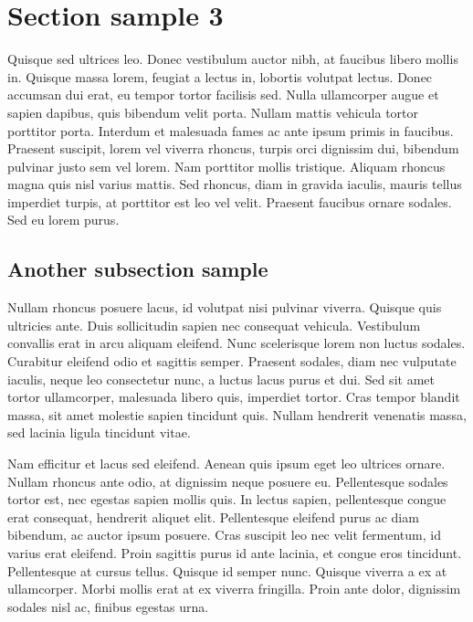 %

\section{Section sample 3}

Quisque sed ultrices leo. Donec vestibulum auctor nibh, at faucibus libero mollis in. Quisque massa lorem, feugiat a lectus in, lobortis volutpat lectus. Donec accumsan dui erat, eu tempor tortor facilisis sed. Nulla ullamcorper augue et sapien dapibus, quis bibendum velit porta. Nullam mattis vehicula tortor porttitor porta. Interdum et malesuada fames ac ante ipsum primis in faucibus. Praesent suscipit, lorem vel viverra rhoncus, turpis orci dignissim dui, bibendum pulvinar justo sem vel lorem. Nam porttitor mollis tristique. Aliquam rhoncus magna quis nisl varius mattis. Sed rhoncus, diam in gravida iaculis, mauris tellus imperdiet turpis, at porttitor est leo vel velit. Praesent faucibus ornare sodales. Sed eu lorem purus.  

\subsection{Another subsection sample}

Nullam rhoncus posuere lacus, id volutpat nisi pulvinar viverra. Quisque quis ultricies ante. Duis sollicitudin sapien nec consequat vehicula. Vestibulum convallis erat in arcu aliquam eleifend. Nunc scelerisque lorem non luctus sodales. Curabitur eleifend odio et sagittis semper. Praesent sodales, diam nec vulputate iaculis, neque leo consectetur nunc, a luctus lacus purus et dui. Sed sit amet tortor ullamcorper, malesuada libero quis, imperdiet tortor. Cras tempor blandit massa, sit amet molestie sapien tincidunt quis. Nullam hendrerit venenatis massa, sed lacinia ligula tincidunt vitae.

Nam efficitur et lacus sed eleifend. Aenean quis ipsum eget leo ultrices ornare. Nullam rhoncus ante odio, at dignissim neque posuere eu. Pellentesque sodales tortor est, nec egestas sapien mollis quis. In lectus sapien, pellentesque congue erat consequat, hendrerit aliquet elit. Pellentesque eleifend purus ac diam bibendum, ac auctor ipsum posuere. Cras suscipit leo nec velit fermentum, id varius erat eleifend. Proin sagittis purus id ante lacinia, et congue eros tincidunt. Pellentesque at cursus tellus. Quisque id semper nunc. Quisque viverra a ex at ullamcorper. Morbi mollis erat at ex viverra fringilla. Proin ante dolor, dignissim sodales nisl ac, finibus egestas urna.

